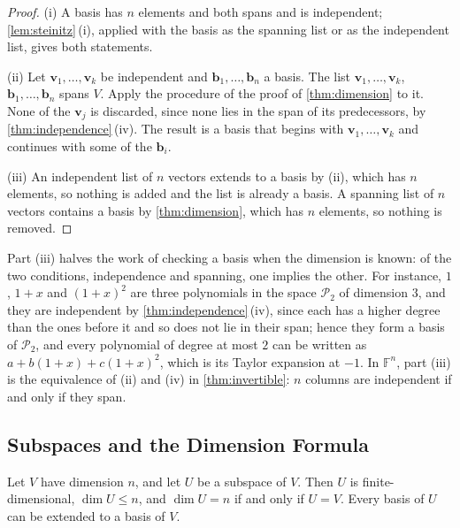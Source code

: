 \begin{proof}
(i) A basis has $n$ elements and both spans and is independent; \cref{lem:steinitz}\,(i), applied with the basis as the spanning list or as the independent list, gives both statements.

(ii) Let $\mathbf v_1,\ldots,\mathbf v_k$ be independent and $\mathbf b_1,\ldots,\mathbf b_n$ a basis. The list $\mathbf v_1,\ldots,\mathbf v_k$, $\mathbf b_1,\ldots,\mathbf b_n$ spans $V$. Apply the procedure of the proof of \cref{thm:dimension} to it. None of the $\mathbf v_j$ is discarded, since none lies in the span of its predecessors, by \cref{thm:independence}\,(iv). The result is a basis that begins with $\mathbf v_1,\ldots,\mathbf v_k$ and continues with some of the $\mathbf b_i$.

(iii) An independent list of $n$ vectors extends to a basis by (ii), which has $n$ elements, so nothing is added and the list is already a basis. A spanning list of $n$ vectors contains a basis by \cref{thm:dimension}, which has $n$ elements, so nothing is removed.
\end{proof}

Part (iii) halves the work of checking a basis when the dimension is known: of the two conditions, independence and spanning, one implies the other. For instance, $1$, $1+x$ and $(1+x)^2$ are three polynomials in the space $\mathcal P_2$ of dimension $3$, and they are independent by \cref{thm:independence}\,(iv), since each has a higher degree than the ones before it and so does not lie in their span; hence they form a basis of $\mathcal P_2$, and every polynomial of degree at most $2$ can be written as $a+b(1+x)+c(1+x)^2$, which is its Taylor expansion at $-1$. In $\mathbb F^n$, part (iii) is the equivalence of (ii) and (iv) in \cref{thm:invertible}: $n$ columns are independent if and only if they span.

\subsection{Subspaces and the Dimension Formula}

\begin{proposition}
\label{prop:subspace-dimension}
Let $V$ have dimension $n$, and let $U$ be a subspace of $V$. Then $U$ is finite-dimensional, $\dim U\le n$, and $\dim U=n$ if and only if $U=V$. Every basis of $U$ can be extended to a basis of $V$.
\end{proposition}

